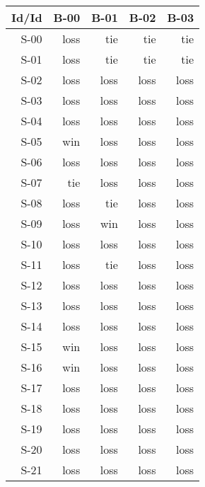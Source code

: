 \begin{tabular}{ | r | r | r | r | r | }
    \hline
        Id/Id  &   B-00  &   B-01  &   B-02  &   B-03  \\
    \hline
    \hline
         S-00  &   loss  &    tie  &    tie  &    tie  \\
    \hline
         S-01  &   loss  &    tie  &    tie  &    tie  \\
    \hline
         S-02  &   loss  &   loss  &   loss  &   loss  \\
    \hline
         S-03  &   loss  &   loss  &   loss  &   loss  \\
    \hline
         S-04  &   loss  &   loss  &   loss  &   loss  \\
    \hline
         S-05  &    win  &   loss  &   loss  &   loss  \\
    \hline
         S-06  &   loss  &   loss  &   loss  &   loss  \\
    \hline
         S-07  &    tie  &   loss  &   loss  &   loss  \\
    \hline
         S-08  &   loss  &    tie  &   loss  &   loss  \\
    \hline
         S-09  &   loss  &    win  &   loss  &   loss  \\
    \hline
         S-10  &   loss  &   loss  &   loss  &   loss  \\
    \hline
         S-11  &   loss  &    tie  &   loss  &   loss  \\
    \hline
         S-12  &   loss  &   loss  &   loss  &   loss  \\
    \hline
         S-13  &   loss  &   loss  &   loss  &   loss  \\
    \hline
         S-14  &   loss  &   loss  &   loss  &   loss  \\
    \hline
         S-15  &    win  &   loss  &   loss  &   loss  \\
    \hline
         S-16  &    win  &   loss  &   loss  &   loss  \\
    \hline
         S-17  &   loss  &   loss  &   loss  &   loss  \\
    \hline
         S-18  &   loss  &   loss  &   loss  &   loss  \\
    \hline
         S-19  &   loss  &   loss  &   loss  &   loss  \\
    \hline
         S-20  &   loss  &   loss  &   loss  &   loss  \\
    \hline
         S-21  &   loss  &   loss  &   loss  &   loss  \\

\end{tabular}
